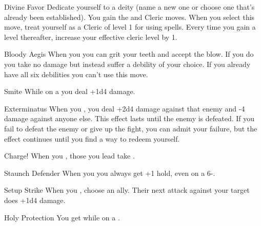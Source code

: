 \documentclass[8pt]{extarticle}
\begin{document}

\begin{multicols}{2}

\firstAdvances

\begin{amove}{Divine Favor}
  Dedicate yourself to a deity (name a new one or choose one that’s
  already been established). You gain the  and
   Cleric moves. When you select this move, treat
  yourself as a Cleric of level 1 for using spells. Every time you
  gain a level thereafter, increase your effective cleric level by 1.
\end{amove}

\begin{amove}{Bloody Aegis}
  When you  you can grit your teeth and accept
  the blow. If you do you take no damage but instead suffer a debility
  of your choice. If you already have all six debilities you can’t use
  this move.
\end{amove}

\begin{amove}{Smite}
  While on a  you deal +1d4 damage.
\end{amove}

\begin{amove}{Exterminatus}
  When you ,
  you deal +2d4 damage against that enemy and -4 damage against anyone
  else. This effect lasts until the enemy is defeated. If you fail to
  defeat the enemy or give up the fight, you can admit your failure,
  but the effect continues until you find a way to redeem yourself.
\end{amove}

\begin{amove}{Charge!}
  When you , those you lead
  take .
\end{amove}

\begin{amove}{Staunch Defender}
  When you  you always get +1 hold, even on a 6-.
\end{amove}

\begin{amove}{Setup Strike}
  When you , choose an ally. Their next attack
  against your target does +1d4 damage.
\end{amove}

\begin{amove}{Holy Protection}
  You get  while on a .
\end{amove}


\end{multicols}
\end{document}
